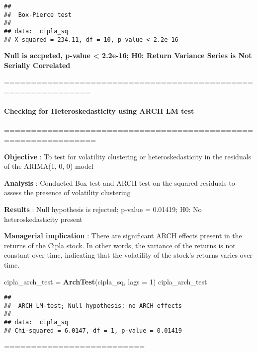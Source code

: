 \documentclass[
]{article}
\newenvironment{Shaded}{\begin{snugshade}}{\end{snugshade}}
\newcommand{\AttributeTok}[1]{\textcolor[rgb]{0.13,0.29,0.53}{#1}}
\newcommand{\DecValTok}[1]{\textcolor[rgb]{0.00,0.00,0.81}{#1}}
\newcommand{\FunctionTok}[1]{\textcolor[rgb]{0.13,0.29,0.53}{\textbf{#1}}}
\newcommand{\NormalTok}[1]{#1}
\newcommand{\OtherTok}[1]{\textcolor[rgb]{0.56,0.35,0.01}{#1}}
\begin{document}
\begin{verbatim}
## 
##  Box-Pierce test
## 
## data:  cipla_sq
## X-squared = 234.11, df = 10, p-value < 2.2e-16
\end{verbatim}

\textbf{Null is accpeted, p-value \textless{} 2.2e-16; H0: Return
Variance Series is Not Serially Correlated}

==============================================================

\hypertarget{checking-for-heteroskedasticity-using-arch-lm-test}{%
\paragraph{\texorpdfstring{\textbf{Checking for Heteroskedasticity using
ARCH LM
test}}{Checking for Heteroskedasticity using ARCH LM test}}\label{checking-for-heteroskedasticity-using-arch-lm-test}}

===============================================================

\textbf{Objective} : To test for volatility clustering or
heteroskedasticity in the residuals of the ARIMA(1, 0, 0) model

\textbf{Analysis} : Conducted Box test and ARCH test on the squared
residuals to assess the presence of volatility clustering

\textbf{Results} : Null hypothesis is rejected; p-value = 0.01419; H0:
No heteroskedasticity present

\textbf{Managerial implication} : There are significant ARCH effects
present in the returns of the Cipla stock. In other words, the variance
of the returns is not constant over time, indicating that the volatility
of the stock's returns varies over time.

\begin{Shaded}
\begin{Highlighting}[]
\NormalTok{cipla\_arch\_test }\OtherTok{=} \FunctionTok{ArchTest}\NormalTok{(cipla\_sq, }\AttributeTok{lags =} \DecValTok{1}\NormalTok{)}
\NormalTok{cipla\_arch\_test}
\end{Highlighting}
\end{Shaded}

\begin{verbatim}
## 
##  ARCH LM-test; Null hypothesis: no ARCH effects
## 
## data:  cipla_sq
## Chi-squared = 6.0147, df = 1, p-value = 0.01419
\end{verbatim}

==========================
\end{document}
